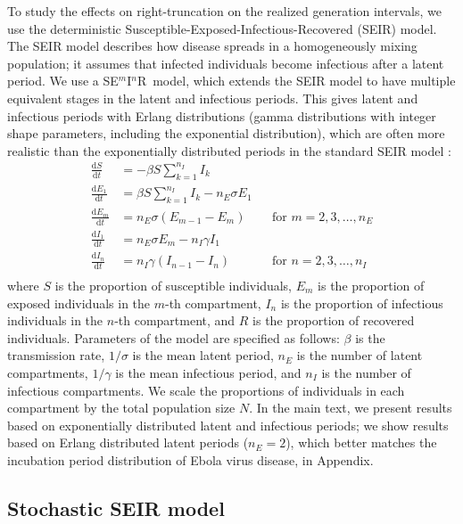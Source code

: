 \documentclass[12pt]{article}
\newcommand{\seminar}{SE\mbox{$^m$}I\mbox{$^n$}R}
\begin{document}
To study the effects on right-truncation on the realized generation intervals, we use the deterministic Susceptible-Exposed-Infectious-Recovered (SEIR) model.
The SEIR model describes how disease spreads in a homogeneously mixing population; it assumes that infected individuals become infectious after a latent period.
We use a \seminar\ model, which extends the SEIR model to have multiple equivalent stages in the latent and infectious periods. This gives latent and infectious periods with Erlang distributions (gamma distributions with integer shape parameters, including the exponential distribution), which are often more realistic than the exponentially distributed periods in the standard SEIR model \citep{anderson1980spread, bailey1964some}: 
\begin{equation}
\begin{aligned}
\frac{\mathrm{d}S}{\mathrm{d}t} &= - \beta S \sum_{k=1}^{n_I} I_k\\
\frac{\mathrm{d}E_1}{\mathrm{d}t} &= \beta S \sum_{k=1}^{n_I} I_k - n_E \sigma E_1\\
\frac{\mathrm{d}E_m}{\mathrm{d}t} &= n_E \sigma (E_{m-1} - E_m) && \text{for } m = 2, 3, \dots, n_E\\
\frac{\mathrm{d}I_1}{\mathrm{d}t} &= n_E \sigma E_m - n_I \gamma I_1\\
\frac{\mathrm{d}I_n}{\mathrm{d}t} &= n_I \gamma (I_{n-1} - I_n) && \text{for } n = 2, 3, \dots, n_I\\
\end{aligned}
\end{equation}
where $S$ is the proportion of susceptible individuals, $E_m$ is the proportion of exposed individuals in the $m$-th compartment, $I_n$ is the proportion of infectious individuals in the $n$-th compartment, and $R$ is the proportion of recovered individuals.
Parameters of the model are specified as follows:  $\beta$ is the transmission rate, $1/\sigma$ is the mean latent period, $n_E$ is the number of latent compartments, $1/\gamma$ is the mean infectious period, and $n_I$ is the number of infectious compartments.
We scale the proportions of individuals in each compartment by the total population size $N$.
In the main text, we present results based on exponentially distributed latent and infectious periods;
we show results based on Erlang distributed latent periods ($n_E=2$), which better matches the incubation period distribution of Ebola virus disease, in Appendix.

\subsection{Stochastic SEIR model}
\end{document}

